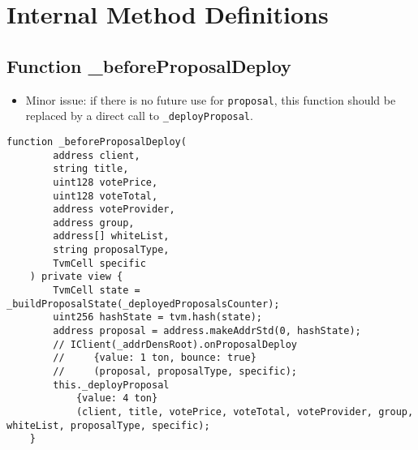 \section{Internal Method Definitions}


\subsection{Function \_{}beforeProposalDeploy}

\begin{itemize}
\item Minor issue: if there is no future use for {\tt proposal}, this
  function should be replaced by a direct call to {\tt \_deployProposal}.
\end{itemize}

\begin{lstlisting}[firstnumber=172]
    function _beforeProposalDeploy(
        address client,
        string title,
        uint128 votePrice,
        uint128 voteTotal,
        address voteProvider,
        address group,
        address[] whiteList,
        string proposalType,
        TvmCell specific
    ) private view {
        TvmCell state = _buildProposalState(_deployedProposalsCounter);
        uint256 hashState = tvm.hash(state);
        address proposal = address.makeAddrStd(0, hashState);
        // IClient(_addrDensRoot).onProposalDeploy
        //     {value: 1 ton, bounce: true}
        //     (proposal, proposalType, specific);
        this._deployProposal
            {value: 4 ton}
            (client, title, votePrice, voteTotal, voteProvider, group, whiteList, proposalType, specific);
    }
\end{lstlisting}
